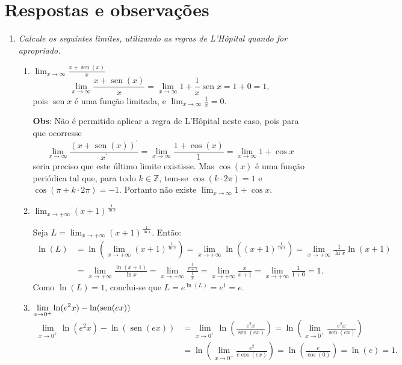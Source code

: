 \documentclass[12pt,a4paper]{article}
\newcommand*\sen{\operatorname{sen}}
\begin{document}
\begin{enumerate}
\end{enumerate}

\newpage
\restoregeometry
\section*{Respostas e observações}

\begin{enumerate}

\item \textit{Calcule os seguintes limites, utilizando as regras de L'Hôpital quando for apropriado.}
\begin{enumerate}
\item $\displaystyle\lim_{x\to\infty} \frac{x+\sen(x)}{x}$
\[
\lim_{x\to\infty} \frac{x+\sen(x)}{x}
= \lim_{x\to\infty} 1 + \frac{1}{x} \sen x
= 1 + 0
=  1,
\]
pois $\sen x$ é uma função limitada, e $\lim_{x\to\infty} \frac{1}{x} = 0$.

\textbf{Obs}: Não é permitido aplicar a regra de L'Hôpital neste caso, pois para que ocorresse
\[
\lim_{x\to\infty} \frac{(x+\sen(x))^\prime}{x^\prime}
= \lim_{x\to\infty} \frac{1+\cos(x)}{1}
= \lim_{x\to\infty} 1 + \cos x
\]
seria preciso que este último limite existisse. Mas $\cos(x)$ é uma função periódica tal que, para todo $k \in \mathbb{Z}$, tem-se $\cos(k \cdot 2\pi) = 1$ e $\cos( \pi + k \cdot 2\pi ) = -1$. Portanto não existe $\lim_{x\to\infty} 1 + \cos x$.

\item $\displaystyle\lim_{x\to +\infty} (x+1)^{\frac{1}{\ln{x}}}$

Seja $L = \lim_{x\to +\infty} (x+1)^{\frac{1}{\ln{x}}}$. Então:
\begin{align*}
\ln(L)
& = \ln\left( \lim_{x\to +\infty} (x+1)^{\frac{1}{\ln{x}}} \right)
  = \lim_{x\to +\infty} \ln\left( (x+1)^{\frac{1}{\ln{x}}} \right)
  = \lim_{x\to +\infty} \frac{1}{\ln{x}} \ln\left(x+1\right) \\
& = \lim_{x\to +\infty} \frac{\ln(x+1)}{\ln{x}}
  = \lim_{x\to +\infty} \frac{\frac{1}{x+1}}{\frac{1}{x}}
  = \lim_{x\to +\infty} \frac{x}{x+1}
  = \lim_{x\to +\infty} \frac{1}{1+0}
  = 1.
\end{align*}
Como $\ln(L) = 1$, conclui-se que $L = e^{\ln(L)} = e^1 = e$.
\item $\displaystyle\lim_{x\to 0^+} \ln(e^2 x)\nolinebreak-\nolinebreak\ln(\sen(e x))$
\begin{align*}
\lim_{x\to 0^+} \ln(e^2 x)-\ln(\sen(e x))
& = \lim_{x\to 0^+} \ln\left(\frac{e^2 x}{\sen(e x)}\right)
  = \ln\left( \lim_{x\to 0^+} \frac{e^2 x}{\sen(e x)}\right) \\
& = \ln\left( \lim_{x\to 0^+} \frac{e^2}{e \cos(e x)}\right)
  = \ln\left( \frac{e}{\cos(0)}\right)
  = \ln\left( e \right) = 1.
\end{align*}
\end{enumerate}


\end{enumerate}
\end{document}
